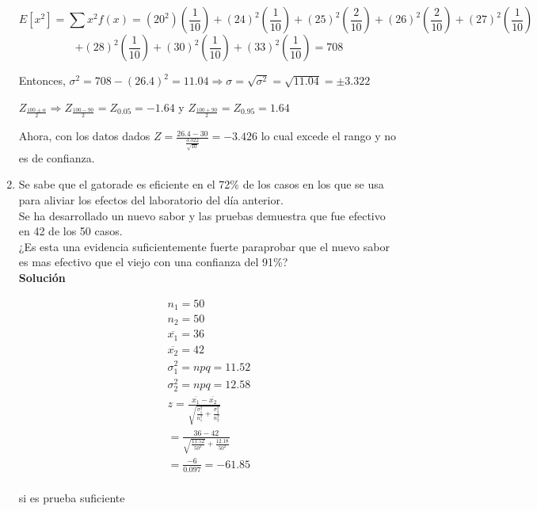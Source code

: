 \begin{enumerate}
    $$ E[x^2] = \sum x^2f(x)= (20^2)\left( \frac{1}{10} \right) + (24)^2\left( \frac{1}{10} \right) + (25)^2\left( \frac{2}{10} \right) + (26)^2\left( \frac{2}{10} \right) + (27)^2\left( \frac{1}{10} \right) $$ $$ +  (28)^2\left( \frac{1}{10} \right) + (30)^2\left( \frac{1}{10} \right)+ (33)^2\left( \frac{1}{10} \right) = 708 $$
    
    Entonces, $ \sigma^2 = 708 - (26.4)^2 = 11.04  \Rightarrow \sigma = \sqrt{\sigma^2} = \sqrt{11.04} = \pm 3.322$ \\
    
    \begin{center}
        $ Z_{\frac{100 \pm \alpha}{2}} \Rightarrow  Z_{\frac{100-90}{2}} = Z_{0.05} = -1.64 $ y $ Z_{\frac{100+90}{2}} = Z_{0.95} = 1.64   $ 
    \end{center}
    
    Ahora, con los datos dados $ Z = \frac{26.4 - 30}{\frac{3.322}{\sqrt{10}}} = -3.426 $ lo cual excede el rango y no es de confianza.
    
    \item Se sabe que el gatorade es eficiente en el 72\% de los casos en los que se usa para aliviar los efectos del laboratorio del día anterior. \\
    Se ha desarrollado un nuevo sabor y las pruebas demuestra que fue efectivo en 42 de los 50 casos.\\
    ¿Es esta una evidencia suficientemente fuerte paraprobar que el nuevo sabor es mas efectivo que el viejo con una confianza del 91\%?
    \\\textbf{Solución}
    
    \begin{gather*}	 
    n_{1} = 50\\
    n_{2} = 50\\
    \overline{x_{1}} = 36\\
    \overline{x_{2}} = 42\\	
    \sigma_{1}^{2} = npq =11.52\\
    \sigma_{2}^{2} = npq =12.58\\
    z = \frac{\overline{x_{1}} - \overline{x_{2}}}{\sqrt{\frac{\sigma_{1}^{2}}{n_{1}^{2}} + \frac{\sigma_{2}^{2}}{n_{2}^{2}}}}\\= \frac{36-42}{\sqrt{\frac{11.52}{50^{2}}}+\frac{12.18}{50^{2}}}\\
    =\frac{-6}{0.097} = -61.85\\
    \end{gather*}
    \begin{center}
         si es prueba suficiente
    \end{center}


\end{enumerate}
